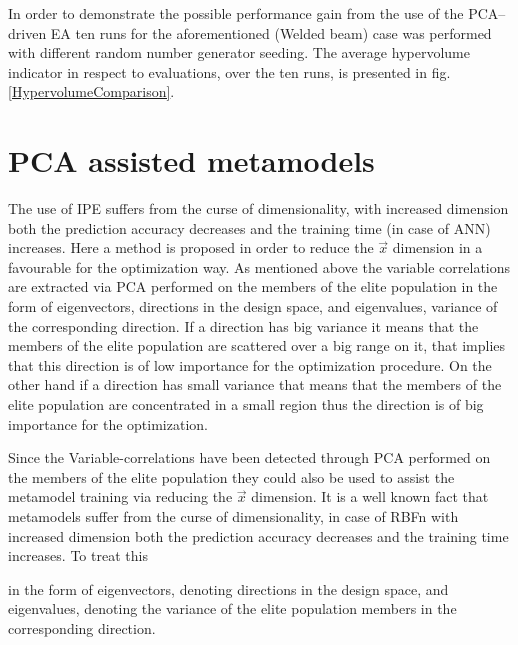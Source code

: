 In order to demonstrate the possible performance gain from the use of the PCA--driven EA ten runs for the aforementioned (Welded beam) case was performed with different random number generator seeding. The average hypervolume indicator in respect to evaluations, over the ten runs, is presented in fig. \ref{HypervolumeComparison}.




\section{PCA assisted metamodels}
The use of IPE suffers from the curse of dimensionality, with increased dimension both the prediction accuracy decreases and the training time (in case of ANN) increases. Here a method is proposed in order to reduce the $\vec{x}$ dimension in a favourable for the optimization way. As mentioned above the variable correlations are extracted via PCA performed on the members of the elite population in the form of eigenvectors, directions in the design space, and eigenvalues, variance of the corresponding direction. If a direction has big variance it means that the members of the elite population are scattered over a big range on it, that implies that this direction is of low importance for the optimization procedure. On the other hand if a direction has small variance that means that the members of the elite population are concentrated in a small region thus the direction is of big importance for the optimization.        

Since the Variable-correlations have been detected through PCA performed on the members of the elite population they could also be used to assist the metamodel training via reducing the $\vec{x}$ dimension. It is a well known fact that metamodels suffer from the curse of dimensionality, in case of RBFn with increased dimension both the prediction accuracy decreases and the training time increases. To treat this 

in the form of eigenvectors, denoting directions in the design space, and eigenvalues, denoting the variance of the elite population members in the corresponding direction. 

